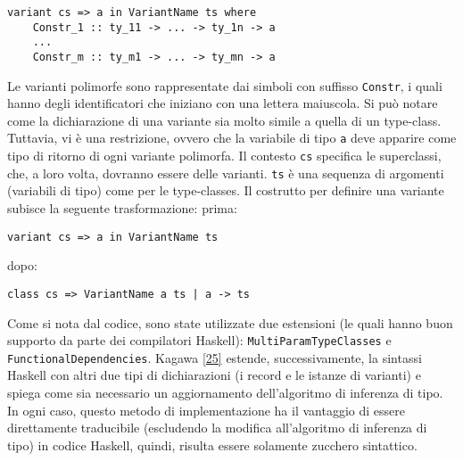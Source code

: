 \documentclass[10pt,a4paper]{article}
\begin{document}
\begin{itemize}
\begin{lstlisting}
variant cs => a in VariantName ts where
    Constr_1 :: ty_11 -> ... -> ty_1n -> a
    ...
    Constr_m :: ty_m1 -> ... -> ty_mn -> a
\end{lstlisting}
    Le varianti polimorfe sono rappresentate dai simboli con suffisso \texttt{Constr}, i quali hanno degli identificatori
    che iniziano con una lettera maiuscola. Si può notare come la dichiarazione di una variante sia molto simile a quella
    di un type-class. Tuttavia, vi è una restrizione, ovvero che la variabile di tipo \texttt{a} deve apparire come tipo
    di ritorno di ogni variante polimorfa. Il contesto \texttt{cs} specifica le superclassi, che, a loro volta, dovranno
    essere delle varianti. \texttt{ts} è una sequenza di argomenti (variabili di tipo) come per le type-classes.
    Il costrutto per definire una variante subisce la seguente trasformazione:
    \newline
    prima:
\begin{lstlisting}
variant cs => a in VariantName ts
\end{lstlisting}
    dopo:
\begin{lstlisting}
class cs => VariantName a ts | a -> ts
\end{lstlisting}
    Come si nota dal codice, sono state utilizzate due estensioni (le quali hanno buon supporto da parte dei compilatori
    Haskell): \texttt{MultiParamTypeClasses} e \texttt{FunctionalDependencies}.
    Kagawa \hyperlink{bibl25}{[25]} estende, successivamente, la sintassi Haskell con altri due tipi di
    dichiarazioni (i record e le istanze di varianti) e spiega come sia necessario un aggiornamento dell'algoritmo di
    inferenza di tipo. In ogni caso, questo metodo di implementazione ha il vantaggio di essere direttamente traducibile
    (escludendo la modifica all'algoritmo di inferenza di tipo) in codice Haskell, quindi, risulta essere solamente
    zucchero sintattico.
\end{itemize}
\end{document}
